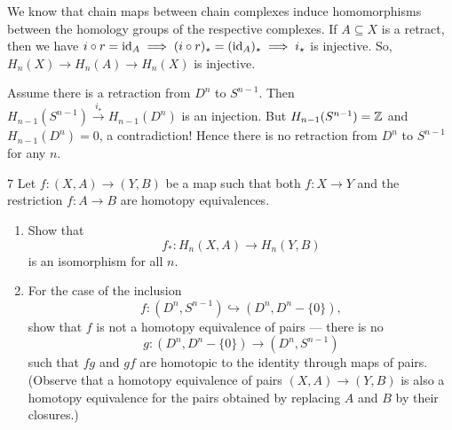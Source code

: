 \documentclass[12pt]{article}
\begin{document}
\begin{solution}
    \bbni

    We know that chain maps between chain complexes induce homomorphisms between the homology groups of the respective complexes. If $A \subseteq X$ is a retract, then we have $i \circ r = \operatorname{id}_A \implies (i \circ r)_\star = (\operatorname{id}_A)_\star \implies i_\star$ is injective. So, $H_n(X) \to H_n(A) \to H_n(X)$ is injective.

    Assume there is a retraction from $D^n$ to $S^{n-1}$. Then $H_{n-1}(S^{n-1}) \xrightarrow{i_\star} H_{n-1}(D^n)$ is an injection. But $H_{n-1}(S^{n-1}) = \mathbb Z$ and $H_{n-1}(D^n) = 0$, a contradiction! Hence there is no retraction from $D^n$ to $S^{n-1}$ for any $n$. 
\end{solution}

\newpage 

\begin{problem}{7}
    Let $f : (X,A) \to (Y,B)$ be a map such that both $f : X \to Y$ and the restriction $f : A \to B$ are homotopy equivalences.

    \begin{enumerate}
        \item Show that
        \[
            f_* : H_n(X,A) \to H_n(Y,B)
        \]
        is an isomorphism for all $n$.

        \item For the case of the inclusion
        \[
            f : (D^n,S^{n-1}) \hookrightarrow (D^n,D^n-\{0\}),
        \]
        show that $f$ is not a homotopy equivalence of pairs --- there is no
        \[
            g : (D^n,D^n-\{0\}) \to (D^n,S^{n-1})
        \]
        such that $fg$ and $gf$ are homotopic to the identity through maps of pairs.
        (Observe that a homotopy equivalence of pairs $(X,A) \to (Y,B)$ is also a homotopy equivalence for the pairs obtained by replacing $A$ and $B$ by their closures.)
    \end{enumerate}
\end{problem}
\end{document}
